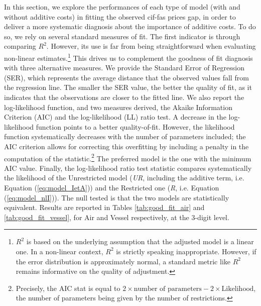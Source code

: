 \documentclass[a4paper,11pt]{article}
\begin{document}
In this section, we explore the performances of each type of model (with and without additive costs) in fitting the observed cif-fas prices gap, in order to deliver a more systematic diagnosis about the importance of additive costs. To do so, we rely on several standard measures of fit. The first indicator is through comparing $R^{2}$. However, its use is far from being straightforward when evaluating non-linear estimates.\footnote{$R^2$ is based on the underlying assumption that the adjusted model is a linear one. In a non-linear context, $R^2$ is strictly speaking inappropriate. However, if the error distribution is approximately normal, a standard metric like $R^2$ remains informative on the quality of adjustment.} This drives us to complement the goodness of fit diagnosis with three alternative measures. We provide the Standard Error of Regression (SER), which represents the average distance that the observed values fall from the regression line. The smaller the SER value, the better the quality of fit, as it indicates that the observations are closer to the fitted line. We also report the log-likelihood function, and two measures derived, the Akaike Information Criterion (AIC) and the log-likelihood (LL) ratio test. A decrease in the log-likelihood function points to a better quality-of-fit. However, the likelihood function systematically decreases with the number of parameters included; the AIC criterion allows for correcting this overfitting by including a penalty in the computation of the statistic.\footnote{Precisely, the AIC stat is equal to $2 \times \textrm{number of parameters} - 2 \times \textrm{Likelihood} $, the number of parameters being given by the number of restrictions.} The preferred model is the one with the minimum AIC value. Finally, the log-likelihood ratio test statistic compares systematically the likelihood of the Unrestricted model (\emph{UR}, including the additive term, i.e. Equation (\ref{eq:model_IetA})) and the Restricted one (\emph{R}, i.e. Equation (\ref{eq:model_nlI})). The null tested is that the two models are statistically equivalent. Results are reported in Tables \ref{tab:good_fit_air} and \ref{tab:good_fit_vessel}, for Air and Vessel respectively, at the 3-digit level.
\end{document}
